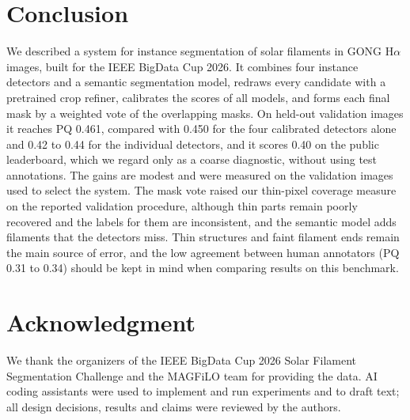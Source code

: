 \documentclass[conference]{IEEEtran}
\begin{document}
\section{Conclusion}
We described a system for instance segmentation of solar filaments in GONG H$\alpha$ images, built for the IEEE BigData Cup 2026. It combines four instance detectors and a semantic segmentation model, redraws every candidate with a pretrained crop refiner, calibrates the scores of all models, and forms each final mask by a weighted vote of the overlapping masks. On held-out validation images it reaches PQ 0.461, compared with 0.450 for the four calibrated detectors alone and 0.42 to 0.44 for the individual detectors, and it scores 0.40 on the public leaderboard, which we regard only as a coarse diagnostic, without using test annotations. The gains are modest and were measured on the validation images used to select the system. The mask vote raised our thin-pixel coverage measure on the reported validation procedure, although thin parts remain poorly recovered and the labels for them are inconsistent, and the semantic model adds filaments that the detectors miss. Thin structures and faint filament ends remain the main source of error, and the low agreement between human annotators (PQ 0.31 to 0.34) should be kept in mind when comparing results on this benchmark.

\section*{Acknowledgment}
We thank the organizers of the IEEE BigData Cup 2026 Solar Filament Segmentation Challenge and the MAGFiLO team for providing the data. AI coding assistants were used to implement and run experiments and to draft text; all design decisions, results and claims were reviewed by the authors.
\end{document}
